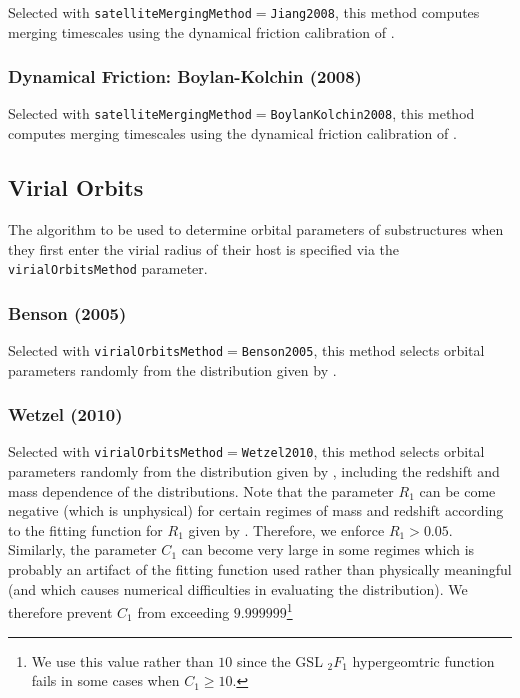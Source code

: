 Selected with {\tt satelliteMergingMethod}$=${\tt Jiang2008}, this method computes merging timescales using the dynamical friction calibration of \cite{jiang_fitting_2008}.

\subsubsection{Dynamical Friction: Boylan-Kolchin (2008)}

Selected with {\tt satelliteMergingMethod}$=${\tt BoylanKolchin2008}, this method computes merging timescales using the dynamical friction calibration of \cite{boylan-kolchin_dynamical_2008}.

\subsection{Virial Orbits}

The algorithm to be used to determine orbital parameters of substructures when they first enter the virial radius of their host is specified via the {\tt virialOrbitsMethod} parameter.

\subsubsection{Benson (2005)}

Selected with {\tt virialOrbitsMethod}$=${\tt Benson2005}, this method selects orbital parameters randomly from the distribution given by \cite{benson_orbital_2005}.

\subsubsection{Wetzel (2010)}

Selected with {\tt virialOrbitsMethod}$=${\tt Wetzel2010}, this method selects orbital parameters randomly from the distribution given by \cite{wetzel_orbits_2010}, including the redshift and mass dependence of the distributions. Note that the parameter $R_1$ can be come negative (which is unphysical) for certain regimes of mass and redshift according to the fitting function for $R_1$ given by \cite{wetzel_orbits_2010}. Therefore, we enforce $R_1>0.05$. Similarly, the parameter $C_1$ can become very large in some regimes which is probably an artifact of the fitting function used rather than physically meaningful (and which causes numerical difficulties in evaluating the distribution). We therefore prevent $C_1$ from exceeding $9.999999$\footnote{We use this value rather than $10$ since the GSL $_2F_1$ hypergeomtric function fails in some cases when $C_1\ge 10$.}

